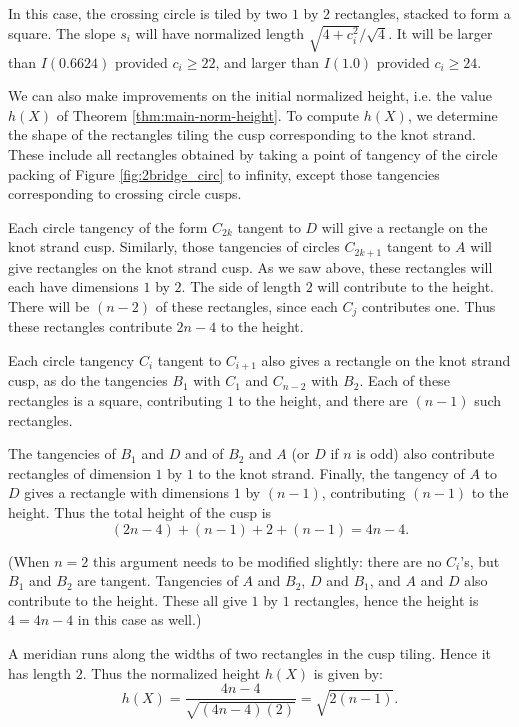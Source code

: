 In this case, the crossing circle is tiled by two $1$ by $2$
rectangles, stacked to form a square.  The slope $s_i$
will have normalized length $\sqrt{4+c_i^2}/\sqrt{4}$.  It will be
larger than $I(0.6624)$ provided $c_i \geq 22$, and larger
than $I(1.0)$ provided $c_i \geq 24$.

We can also make improvements on the initial normalized height,
i.e. the value $h(X)$ of Theorem \ref{thm:main-norm-height}.  To
compute $h(X)$, we determine the shape of the rectangles tiling the
cusp corresponding to the knot strand.  These include all rectangles
obtained by taking a point of tangency of the circle packing of Figure
\ref{fig:2bridge_circ} to infinity, except those tangencies
corresponding to crossing circle cusps.

Each circle tangency of the form $C_{2k}$ tangent to $D$ will give a
rectangle on the knot strand cusp.  Similarly, those tangencies of
circles $C_{2k+1}$ tangent to $A$ will give rectangles on the knot
strand cusp.  As we saw above, these rectangles will each have
dimensions $1$ by $2$.  The side of length $2$ will contribute to the
height.  There will be $(n-2)$ of these rectangles, since each $C_j$
contributes one.  Thus these rectangles contribute $2n-4$ to the
height.

Each circle tangency $C_i$ tangent to $C_{i+1}$ also gives a rectangle
on the knot strand cusp, as do the tangencies $B_1$ with $C_1$ and
$C_{n-2}$ with $B_2$.  Each of these rectangles is a square,
contributing $1$ to the height, and there are $(n-1)$ such rectangles.

The tangencies of $B_1$ and $D$ and of $B_2$ and $A$ (or $D$ if $n$ is
odd) also contribute rectangles of dimension $1$ by $1$ to the knot
strand.  Finally, the tangency of $A$ to $D$ gives a rectangle with
dimensions $1$ by $(n-1)$, contributing $(n-1)$ to the height.  Thus
the total height of the cusp is
$$(2n-4) + (n-1) + 2 + (n-1) = 4n -4.$$

(When $n=2$ this argument needs to be modified slightly:  there are no
$C_i$'s, but $B_1$ and $B_2$ are tangent.  Tangencies of $A$ and
$B_2$, $D$ and $B_1$, and $A$ and $D$ also contribute to the height.
These all give $1$ by $1$ rectangles, hence the height is $4 = 4n-4$
in this case as well.)

A meridian runs along the widths of two rectangles in the cusp
tiling.  Hence it has length $2$.  Thus the normalized height $h(X)$
is given by:
$$h(X) = \frac{4n-4}{\sqrt{(4n-4)(2)}} = \sqrt{2(n-1)}.$$

